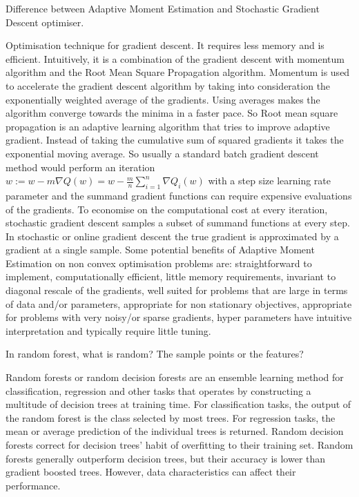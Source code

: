 Difference between Adaptive Moment Estimation and Stochastic Gradient Descent optimiser.

Optimisation technique for gradient descent. It requires less memory and is efficient. Intuitively, it is a combination of the gradient descent with momentum algorithm and the Root Mean Square Propagation algorithm. Momentum is used to accelerate the gradient descent algorithm by taking into consideration the exponentially weighted average of the gradients. Using averages makes the algorithm converge towards the minima in a faster pace. So Root mean square propagation is an adaptive learning algorithm that tries to improve adaptive gradient. Instead of taking the cumulative sum of squared gradients it takes the exponential moving average. So usually a standard batch gradient descent method would perform an iteration $w := w-m \nabla Q(w) = w - \frac{m}{n} \sum_{i=1}^n \nabla Q_i (w)$ with a step size learning rate parameter and the summand gradient functions can require expensive evaluations of the gradients. To economise on the computational cost at every iteration, stochastic gradient descent samples a subset of summand functions at every step. In stochastic or online gradient descent the true gradient is approximated by a gradient at a single sample. Some potential benefits of Adaptive Moment Estimation on non convex optimisation problems are: straightforward to implement, computationally efficient, little memory requirements, invariant to diagonal rescale of the gradients, well suited for problems that are large in terms of data and/or parameters, appropriate for non stationary objectives, appropriate for problems with very noisy/or sparse gradients, hyper parameters have intuitive interpretation and typically require little tuning.

In random forest, what is random? The sample points or the features?

Random forests or random decision forests are an ensemble learning method for classification, regression and other tasks that operates by constructing a multitude of decision trees at training time. For classification tasks, the output of the random forest is the class selected by most trees. For regression tasks, the mean or average prediction of the individual trees is returned. Random decision forests correct for decision trees' habit of overfitting to their training set. Random forests generally outperform decision trees, but their accuracy is lower than gradient boosted trees. However, data characteristics can affect their performance.

